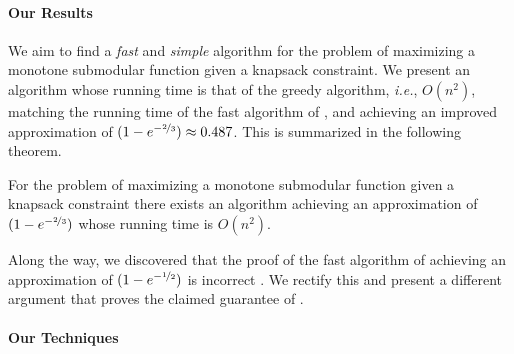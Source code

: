 \paragraph*{Our Results}
We aim to find a {\em fast} and {\em simple} algorithm for the problem of maximizing a monotone submodular function given a knapsack constraint.
We present an algorithm whose running time is that of the greedy algorithm, {\em i.e.}, $O(n^2)$, matching the running time of the fast algorithm of \cite{khuller1999budgeted}, and achieving an improved approximation of $(1-e^{-\nicefrac[]{2}{3}})\approx 0.487$.
This is summarized in the following theorem.
\begin{theorem}\label{thrm:OurAlgorithm}
For the problem of maximizing a monotone submodular function given a knapsack constraint there exists an algorithm achieving an approximation of $(1-e^{-\nicefrac[]{2}{3}})$ whose running time is $O(n ^2)$.
\end{theorem}
Along the way, we discovered that the proof of the fast algorithm of \cite{khuller1999budgeted} achieving an approximation of $(1-e^{-\nicefrac[]{1}{2}})$ is incorrect \cite{naor}.
We rectify this and present a different argument that proves the claimed guarantee of \cite{khuller1999budgeted}.

\paragraph*{Our Techniques}
{\color{red}{TBD}}